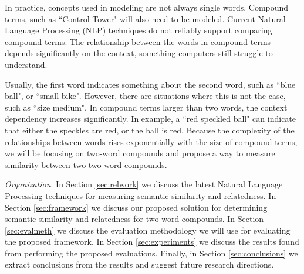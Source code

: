 \documentclass{article}
\begin{document}
In practice, concepts used in modeling are not always single words. Compound terms, such as ``Control Tower" will also need to be modeled. Current Natural Language Processing (NLP) techniques do not reliably support comparing compound terms. The relationship between the words in compound terms depends significantly on the context, something computers still struggle to understand. 

Usually, the first word indicates something about the second word, such as ``blue ball", or ``small bike". However, there are situations where this is not the case, such as ``size medium". In compound terms larger than two words, the context dependency increases significantly. In example, a ``red speckled ball" can indicate that either the speckles are red, or the ball is red. Because the complexity of the relationships between words rises exponentially with the size of compound terms, we will be focusing on two-word compounds and propose a way to measure similarity between two two-word compounds.

\emph{Organization}. In Section \ref{sec:relwork} we discuss the latest Natural Language Processing techniques for measuring semantic similarity and relatedness. In Section \ref{sec:framework} we discuss our proposed solution for determining semantic similarity and relatedness for two-word compounds. In Section \ref{sec:evalmeth} we discuss the evaluation methodology we will use for evaluating the proposed framework. In Section \ref{sec:experiments} we discuss the results found from performing the proposed evaluations. Finally, in Section \ref{sec:conclusions} we extract conclusions from the results and suggest future research directions.


\end{document}
